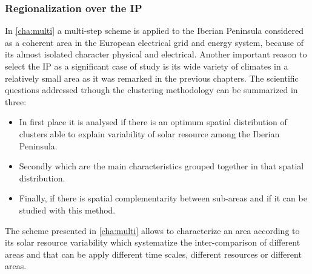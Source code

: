 

\subsubsection{Regionalization over the IP}

In \ref{cha:multi} a multi-step scheme is applied to the Iberian Peninsula considered as a coherent area in the European electrical grid and energy system, because of its almost isolated character physical and electrical. Another important reason to select the IP as a significant case of study is its wide variety of climates in a relatively small area as it was remarked in the previous chapters. The scientific questions addressed trhough the clustering methodology can be summarized in three:

\begin{itemize}
  
\item In first place it is analysed if there is an optimum spatial distribution of clusters able to explain variability of solar resource among the Iberian Peninsula.

\item Secondly which are the main characteristics grouped together in that spatial distribution.

\item Finally, if there is spatial complementarity between sub-areas and if it can be studied with this method.

\end{itemize}

The scheme presented in \ref{cha:multi} allows to characterize an area according to its solar resource variability which systematize the inter-comparison of different areas and that can be apply different time scales, different resources or different areas.

